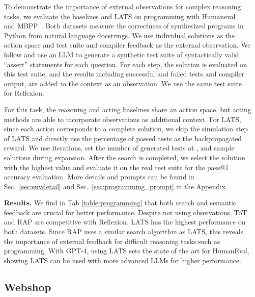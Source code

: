 \documentclass{article} \usepackage{iclr2024_conference,times}
\begin{document}
To demonstrate the importance of external observations for complex reasoning tasks, we evaluate the baselines and LATS on programming with Humaneval~\citep{chen2021evaluating} and MBPP~\citep{austin2021program}. Both datasets measure the correctness of synthesized programs in Python from natural language docstrings. We use individual solutions as the action space and test suite and compiler feedback as the external observation. We follow \citet{bei2022codet} and use an LLM to generate a synthetic test suite of syntactically valid ``assert'' statements for each question. For each step, the solution is evaluated on this test suite, and the results including successful and failed tests and compiler output, are added to the context as an observation. We use the same test suite for Reflexion. 

For this task, the reasoning and acting baselines share an action space, but acting methods are able to incorporate observations as additional context. For LATS, since each action corresponds to a complete solution, we skip the simulation step of LATS and directly use the percentage of passed tests as the backpropagated reward. We use  iterations, set the number of generated tests at , and sample  solutions during expansion. After the search is completed, we select the solution with the highest value and evaluate it on the real test suite for the pass@1 accuracy evaluation. More details and prompts can be found in Sec.~\ref{sec:envdetail} and Sec.~\ref{sec:programming_prompt} in the Appendix.

\textbf{Results.} We find in Tab \ref{table:programming} that both search and semantic feedback are crucial for better performance. Despite not using observations, ToT and RAP are competitive with Reflexion. LATS has the highest performance on both datasets. Since RAP uses a similar search algorithm as LATS, this reveals the importance of external feedback for difficult reasoning tasks such as programming. With GPT-4, using LATS sets the state of the art for HumanEval, showing LATS can be used with more advanced LLMs for higher performance.

\subsection{Webshop}
\end{document}
